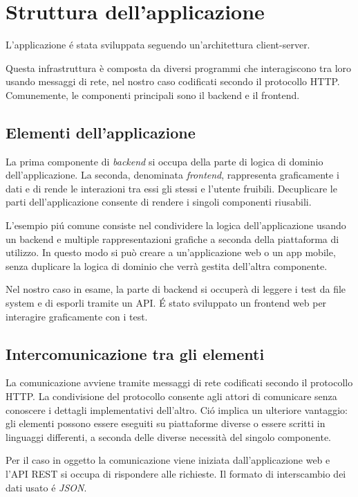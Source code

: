 \chapter{Struttura dell'applicazione}
    L'applicazione \'e stata sviluppata seguendo un'architettura client-server.
    
    Questa infrastruttura è composta da diversi programmi che interagiscono tra loro usando messaggi di rete, nel nostro caso codificati secondo il protocollo HTTP.
    Comunemente, le componenti principali sono il backend e il frontend.    

    \section{Elementi dell'applicazione}
        La prima componente di \textit{backend} si occupa della parte di logica di dominio dell'applicazione.
        La seconda, denominata \textit{frontend}, rappresenta graficamente i dati e di rende le interazioni tra essi gli stessi e l'utente fruibili.
        Decuplicare le parti dell'applicazione consente di rendere i singoli componenti riusabili.

        L'esempio pi\'u comune consiste nel condividere la logica dell'applicazione usando un backend e multiple rappresentazioni grafiche a seconda della piattaforma di utilizzo.
        In questo modo si può creare a un'applicazione web o un app mobile, senza duplicare la logica di dominio che verrà gestita dell'altra componente.
        
        Nel nostro caso in esame, la parte di backend si occuperà di leggere i test da file system e di esporli tramite un API.
        \'E stato sviluppato un frontend web per interagire graficamente con i test.

    \section{Intercomunicazione tra gli elementi}
        La comunicazione avviene tramite messaggi di rete codificati secondo il protocollo HTTP.
        La condivisione del protocollo consente agli attori di comunicare senza conoscere i dettagli implementativi dell'altro.
        Ci\'o implica un ulteriore vantaggio: gli elementi possono essere eseguiti su piattaforme diverse o essere scritti in linguaggi differenti, a seconda delle diverse necessità del singolo componente.
        
        Per il caso in oggetto la comunicazione viene iniziata dall'applicazione web e l'API REST si occupa di rispondere alle richieste.
        Il formato di interscambio dei dati usato \'e \textit{JSON}.

